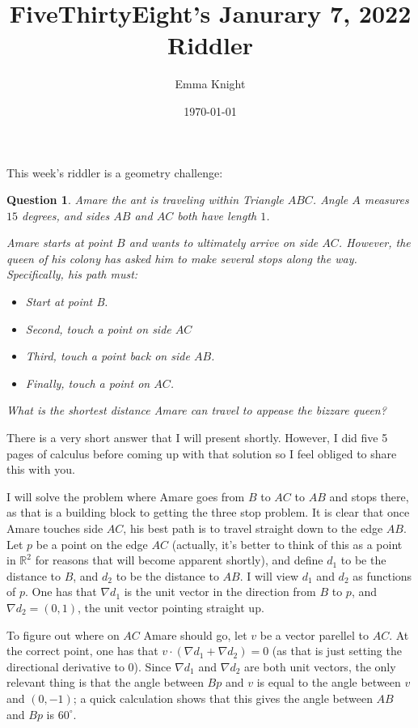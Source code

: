 \documentclass[11pt]{article}
\title{FiveThirtyEight's Janurary 7, 2022 Riddler}
\author{Emma Knight}
\date{\today}
\newtheorem{question}[theorem]{Question}
\theoremstyle{definition}
\newcommand{\R}{\mathbb{R}}
\begin{document}
\maketitle
This week's riddler is a geometry challenge:
\begin{question}
Amare the ant is traveling within Triangle $ABC$. Angle $A$ measures $15$ degrees, and sides $AB$ and $AC$ both have length $1$.

Amare starts at point $B$ and wants to ultimately arrive on side $AC$. However, the queen of his colony has asked him to make several stops along the way. Specifically, his path must:
\begin{itemize}
\item Start at point B.
\item Second, touch a point on side $AC$
\item Third, touch a point back on side $AB$.
\item Finally, touch a point on $AC$.
\end{itemize}
What is the shortest distance Amare can travel to appease the bizzare queen?
\end{question}

There is a very short answer that I will present shortly.  However, I did five 5 pages of calculus before coming up with that solution so I feel obliged to share this with you.

I will solve the problem where Amare goes from $B$ to $AC$ to $AB$ and stops there, as that is a building block to getting the three stop problem.  It is clear that once Amare touches side $AC$, his best path is to travel straight down to the edge $AB$.  Let $p$ be a point on the edge $AC$ (actually, it's better to think of this as a point in $\R^2$ for reasons that will become apparent shortly), and define $d_1$ to be the distance to $B$, and $d_2$ to be the distance to $AB$.  I will view $d_1$ and $d_2$ as functions of $p$.  One has that $\nabla d_1$ is the unit vector in the direction from $B$ to $p$, and $\nabla d_2 = (0, 1)$, the unit vector pointing straight up.

To figure out where on $AC$ Amare should go, let $v$ be a vector parellel to $AC$.  At the correct point, one has that $v\cdot(\nabla d_1 + \nabla d_2) = 0$ (as that is just setting the directional derivative to $0$).  Since $\nabla d_1$ and $\nabla d_2$ are both unit vectors, the only relevant thing is that the angle between $Bp$ and $v$ is equal to the angle between $v$ and $(0, -1)$; a quick calculation shows that this gives the angle between $AB$ and $Bp$ is $60^\circ$.
\end{document}
